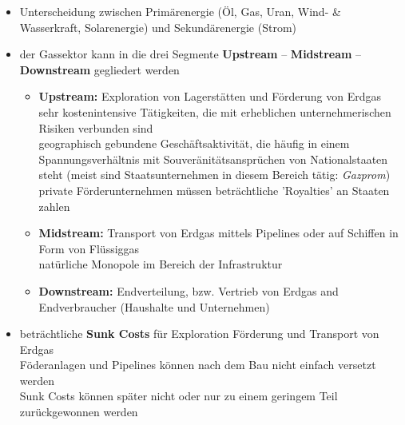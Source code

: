 \documentclass[11pt,a4paper]{article}
\begin{document}
\begin{itemize}

\item Unterscheidung zwischen Primärenergie (Öl, Gas, Uran, Wind- \& Wasserkraft, Solarenergie) und Sekundärenergie (Strom)

\item der Gassektor kann in die drei Segmente \textbf{Upstream} -- \textbf{Midstream} -- \textbf{Downstream} gegliedert werden

	\begin{itemize}
	\item \textbf{Upstream:} Exploration von Lagerstätten und Förderung von Erdgas\\
	 sehr kostenintensive Tätigkeiten, die mit erheblichen unternehmerischen Risiken verbunden sind\\
	 geographisch gebundene Geschäftsaktivität, die häufig in einem Spannungsverhältnis mit Souveränitätsansprüchen von Nationalstaaten steht (meist sind Staatsunternehmen in diesem Bereich tätig: \textsl{Gazprom})\\
	 private Förderunternehmen müssen beträchtliche 'Royalties' an Staaten zahlen

	\vspace{1cm}

	\item \textbf{Midstream:} Transport von Erdgas mittels Pipelines oder auf Schiffen in Form von Flüssiggas\\
	 natürliche Monopole im Bereich der Infrastruktur

	\vspace{1cm}

	\item \textbf{Downstream:} Endverteilung, bzw. Vertrieb von Erdgas and Endverbraucher (Haushalte und Unternehmen)

	\vspace{1cm}

	\end{itemize}

\item beträchtliche \textbf{Sunk Costs} für Exploration Förderung und Transport von Erdgas\\
 Föderanlagen und Pipelines können nach dem Bau nicht einfach versetzt werden\\
 Sunk Costs können später nicht oder nur zu einem geringem Teil zurückgewonnen werden\\


\end{itemize}
\end{document}
